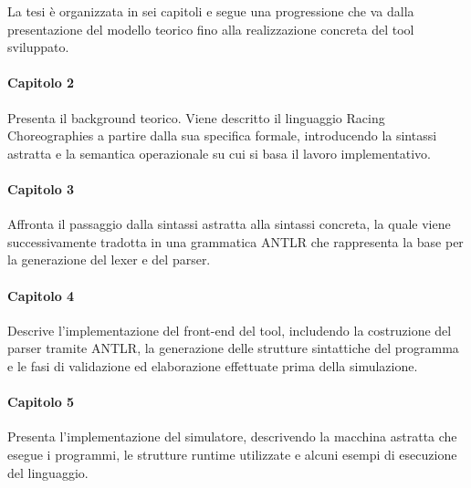 La tesi è organizzata in sei capitoli e segue una progressione che va dalla presentazione del modello teorico fino alla realizzazione concreta del tool sviluppato.

\paragraph{Capitolo 2}
Presenta il background teorico. Viene descritto il linguaggio Racing Choreographies a partire dalla sua specifica formale, introducendo la sintassi astratta e la semantica operazionale su cui si basa il lavoro implementativo.

\paragraph{Capitolo 3}
Affronta il passaggio dalla sintassi astratta alla sintassi concreta, la quale viene successivamente tradotta in una grammatica ANTLR che rappresenta la base per la generazione del lexer e del parser.

\paragraph{Capitolo 4}
Descrive l’implementazione del front-end del tool, includendo la costruzione del parser tramite ANTLR, la generazione delle strutture sintattiche del programma e le fasi di validazione ed elaborazione effettuate prima della simulazione.

\paragraph{Capitolo 5}
Presenta l’implementazione del simulatore, descrivendo la macchina astratta che esegue i programmi, le strutture runtime utilizzate e alcuni esempi di esecuzione del linguaggio.